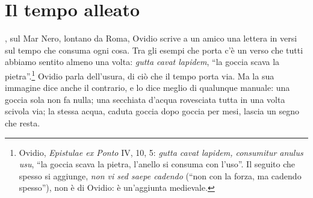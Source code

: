 %
\chapter{Il tempo alleato}
\label{cap:tempo}


, sul Mar Nero, lontano da Roma, Ovidio
scrive a un amico una lettera in versi sul tempo che
consuma ogni cosa. Tra gli esempi che porta c'è un verso che tutti
abbiamo sentito almeno una volta:
\emph{gutta cavat lapidem}, \enquote{la goccia scava la
pietra}.\footnote{Ovidio, \emph{Epistulae ex Ponto} IV, 10, 5:
\emph{gutta cavat lapidem, consumitur anulus usu}, \enquote{la goccia
scava la pietra, l'anello si consuma con l'uso}. Il seguito che spesso
si aggiunge, \emph{non vi sed saepe cadendo} (\enquote{non con la
forza, ma cadendo spesso}), non è di Ovidio: è un'aggiunta
medievale.} Ovidio parla dell'usura, di ciò che il tempo porta via. Ma
la sua immagine dice anche il contrario, e lo dice meglio di qualunque
manuale: una goccia sola non fa nulla; una secchiata d'acqua rovesciata
tutta in una volta scivola via; la stessa acqua, caduta goccia dopo
goccia per mesi, lascia un segno che resta.

